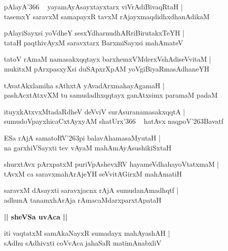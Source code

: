 \documentclass[twoside,12pt,openright]{book}
\def\S{\char'263}
\newcounter{shloka}[chapter]
\def\uvaca#1{\centerline{{\large\textbf{#1}}}}
\begin{document}
\begin{shloka}%
pAlayA\char'366 ~ yayamAyAsayxtayxtarx viVrAdiBivaqRtaH |\\
tasemxY saravxM samapayxR tavxM rAjayxmaqdidhxdhanAdikaM 
\end{shloka}

\begin{shloka}%
pAlayiSayxsi yoVdheY sesxYdharnudhARriBirutakxTeYH |\\
tataH paqthivAyxM saravxtarx BarxmiSayxsi mahAmateV 
\end{shloka}

\begin{shloka}%
tatoV rAmaM namasakxqqtayx barxhemxVMderxVshAdiseVvitaM |\\
mukitxM pArxpasxyXsi duSApxrXpAM yoVgiBiyaRmasAdhaneYH
\end{shloka}

\begin{shloka}%
tAvatAkxlamiha sAthxtA yAvadArxmahayAgamaH |\\
pashAcxtAtxvXM tu samudadhxqqtayx ganAtxsimx paramaM padaM 
\end{shloka}

\begin{shloka}%
ituyxkAtxvxMtadaRdheV deVviV surAsuranamasakxqqtA |\\
sumudoVpayxhicaCxtAyxyAM shatUrx\char'366 ~ hatAvx naqpoV\S Bavatf
\end{shloka}

\begin{shloka}%
ESa rAjA samatoRV\S pi balavAhamasaMyutaH |\\
na garxhiVSayxti tev vAyaM mahAmAyAsushikiSxtaH 
\end{shloka}

\begin{shloka}%
shurxtAvx pArxpatxM puriVpAshevxRV hayameVdhahayoVtatxmaM |\\
tAvxM ca saravxmahArAjeYH seVvitAGirxM mahAmatiH 
\end{shloka}

\begin{shloka}%
saravxM dAsayxti saravxjacnx rAjA sumudanAmadhqtf |\\
adhunA tanamxhArAja rAmacaMdarxparxtApataH 
\end{shloka}

\uvaca{|| sheVSa uvAca ||}

\begin{shloka}%
iti vaqtatxM samAkaNayxR sumadayx mahAyashAH |\\
sAdhu sAdhivxti coVvAca jahaSaR matimAnabxliV 
\end{shloka}
\end{document}
